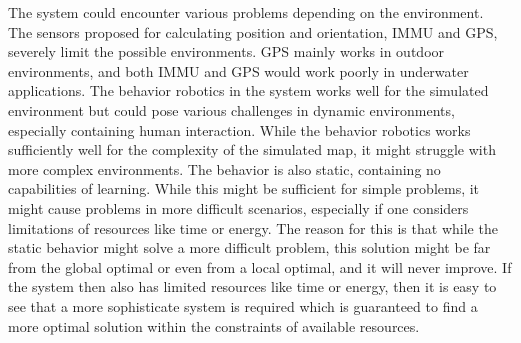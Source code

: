 The system could encounter various problems depending on the environment. The sensors proposed for calculating position and orientation, IMMU and GPS, severely limit the possible environments. GPS mainly works in outdoor environments, and both IMMU and GPS would work poorly in underwater applications. 
The behavior robotics in the system works well for the simulated environment but could pose various challenges in dynamic environments, especially containing human interaction.
While the behavior robotics works sufficiently well for the complexity of the simulated map, it might struggle with more complex environments.
The behavior is also static, containing no capabilities of learning. While this might be sufficient for simple problems, it might cause problems in more difficult scenarios, especially if one considers limitations of resources like time or energy. The reason for this is that while the static behavior might solve a more difficult problem, this solution might be far from the global optimal or even from a local optimal, and it will never improve. If the system then also has limited resources like time or energy, then it is easy to see that a more sophisticate system is required which is guaranteed to find a more optimal solution within the constraints of available resources.



\begin{comment}
\end{comment}
